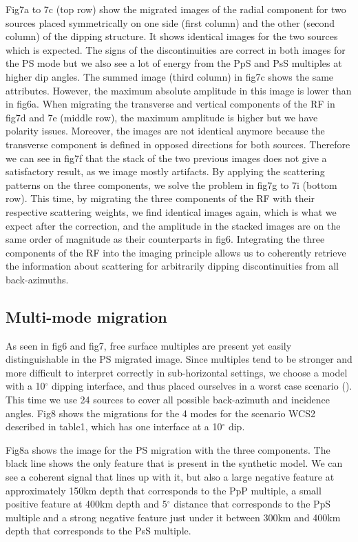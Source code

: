 \documentclass[9pt,a4paper]{article}
\numberwithin{equation}{section}
\begin{document}
\begin{multicols}{2}
Fig7a to 7c (top row) show the migrated images of the radial component for two sources placed symmetrically on one side (first column) and the other (second column) of the dipping structure.
It shows identical images for the two sources which is expected.
The signs of the discontinuities are correct in both images for the PS mode but we also see a lot of energy from the PpS and PsS multiples at higher dip angles.
The summed image (third column) in fig7c shows the same attributes.
However, the maximum absolute amplitude in this image is lower than in fig6a.
When migrating the transverse and vertical components of the RF in fig7d and 7e (middle row), the maximum amplitude is higher but we have polarity issues.
Moreover, the images are not identical anymore because the transverse component is defined in opposed directions for both sources.
Therefore we can see in fig7f that the stack of the two previous images does not give a satisfactory result, as we image mostly artifacts.
By applying the scattering patterns on the three components, we solve the problem in fig7g to 7i (bottom row).
This time, by migrating the three components of the RF with their respective scattering weights, we find identical images again, which is what we expect after the correction, and the amplitude in the stacked images are on the same order of magnitude as their counterparts in fig6.
Integrating the three components of the RF into the imaging principle allows us to coherently retrieve the information about scattering for arbitrarily dipping discontinuities from all back-azimuths.

\subsection{Multi-mode migration}

As seen in fig6 and fig7, free surface multiples are present yet easily distinguishable in the PS migrated image.
Since multiples tend to be stronger and more difficult to interpret correctly in sub-horizontal settings, we choose a model with a 10$^{\circ}$ dipping interface, and thus placed ourselves in a worst case scenario (\cite{cheng_grl_17}).
This time we use 24 sources to cover all possible back-azimuth and incidence angles.
Fig8 shows the migrations for the 4 modes for the scenario WCS2 described in table1, which has one interface at a 10$^{\circ}$ dip.

Fig8a shows the image for the PS migration with the three components.
The black line shows the only feature that is present in the synthetic model.
We can see a coherent signal that lines up with it, but also a large negative feature at approximately 150km depth that corresponds to the PpP multiple, a small positive feature at 400km depth and 5$^{\circ}$ distance that corresponds to the PpS multiple and a strong negative feature just under it between 300km and 400km depth that corresponds to the PsS multiple.


\end{multicols}
\end{document}
